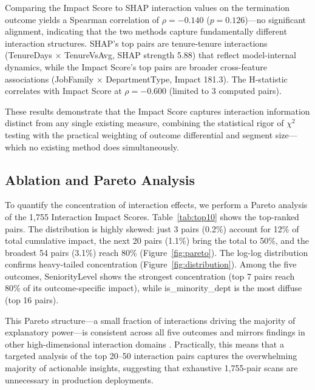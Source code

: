 \documentclass[conference]{IEEEtran}
\begin{document}
Comparing the Impact Score to SHAP interaction values on the termination outcome yields a Spearman correlation of $\rho = -0.140$ ($p = 0.126$)---no significant alignment, indicating that the two methods capture fundamentally different interaction structures. SHAP's top pairs are tenure-tenure interactions (TenureDays $\times$ TenureVsAvg, SHAP strength 5.88) that reflect model-internal dynamics, while the Impact Score's top pairs are broader cross-feature associations (JobFamily $\times$ DepartmentType, Impact 181.3). The H-statistic correlates with Impact Score at $\rho = -0.600$ (limited to 3 computed pairs).

These results demonstrate that the Impact Score captures interaction information distinct from any single existing measure, combining the statistical rigor of $\chi^2$ testing with the practical weighting of outcome differential and segment size---which no existing method does simultaneously.

\subsection{Ablation and Pareto Analysis}

To quantify the concentration of interaction effects, we perform a Pareto analysis of the 1,755 Interaction Impact Scores. Table~\ref{tab:top10} shows the top-ranked pairs. The distribution is highly skewed: just 3 pairs (0.2\%) account for 12\% of total cumulative impact, the next 20 pairs (1.1\%) bring the total to 50\%, and the broadest 54 pairs (3.1\%) reach 80\% (Figure~\ref{fig:pareto}). The log-log distribution confirms heavy-tailed concentration (Figure~\ref{fig:distribution}). Among the five outcomes, SeniorityLevel shows the strongest concentration (top 7 pairs reach 80\% of its outcome-specific impact), while is\_minority\_dept is the most diffuse (top 16 pairs).

This Pareto structure---a small fraction of interactions driving the majority of explanatory power---is consistent across all five outcomes and mirrors findings in other high-dimensional interaction domains \cite{sorokina2008detecting}. Practically, this means that a targeted analysis of the top 20--50 interaction pairs captures the overwhelming majority of actionable insights, suggesting that exhaustive 1,755-pair scans are unnecessary in production deployments.
\end{document}
